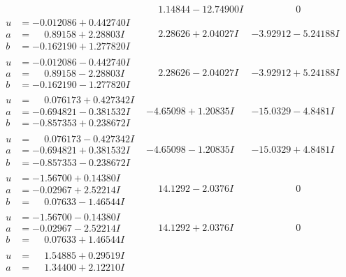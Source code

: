 \documentclass[1p]{elsarticle_modified}
\theoremstyle{definition}
\begin{document}
$$\begin{array}{c|c|c}
 & \phantom{-}1.14844 - 12.74900 I & \phantom{-0.000000 } 0 \\ \hline\begin{aligned}
u &= -0.012086 + 0.442740 I \\
a &= \phantom{-}0.89158 + 2.28803 I \\
b &= -0.162190 + 1.277820 I\end{aligned}
 & \phantom{-}2.28626 + 2.04027 I & -3.92912 - 5.24188 I \\ \hline\begin{aligned}
u &= -0.012086 - 0.442740 I \\
a &= \phantom{-}0.89158 - 2.28803 I \\
b &= -0.162190 - 1.277820 I\end{aligned}
 & \phantom{-}2.28626 - 2.04027 I & -3.92912 + 5.24188 I \\ \hline\begin{aligned}
u &= \phantom{-}0.076173 + 0.427342 I \\
a &= -0.694821 - 0.381532 I \\
b &= -0.857353 + 0.238672 I\end{aligned}
 & -4.65098 + 1.20835 I & -15.0329 - 4.8481 I \\ \hline\begin{aligned}
u &= \phantom{-}0.076173 - 0.427342 I \\
a &= -0.694821 + 0.381532 I \\
b &= -0.857353 - 0.238672 I\end{aligned}
 & -4.65098 - 1.20835 I & -15.0329 + 4.8481 I \\ \hline\begin{aligned}
u &= -1.56700 + 0.14380 I \\
a &= -0.02967 + 2.52214 I \\
b &= \phantom{-}0.07633 - 1.46544 I\end{aligned}
 & \phantom{-}14.1292 - 2.0376 I & \phantom{-0.000000 } 0 \\ \hline\begin{aligned}
u &= -1.56700 - 0.14380 I \\
a &= -0.02967 - 2.52214 I \\
b &= \phantom{-}0.07633 + 1.46544 I\end{aligned}
 & \phantom{-}14.1292 + 2.0376 I & \phantom{-0.000000 } 0 \\ \hline\begin{aligned}
u &= \phantom{-}1.54885 + 0.29519 I \\
a &= \phantom{-}1.34400 + 2.12210 I \\

\end{aligned}
\end{array}$$
\end{document}
